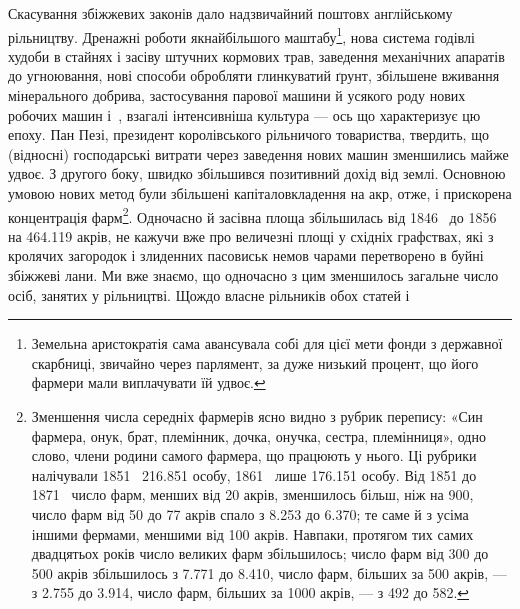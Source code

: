 Скасування збіжжевих законів дало надзвичайний поштовх
англійському рільництву. Дренажні роботи якнайбільшого маштабу\footnote{
Земельна аристократія сама авансувала собі для цієї мети фонди
з державної скарбниці, звичайно через парлямент, за дуже низький
процент, що його фармери мали виплачувати їй удвоє.
},
нова система годівлі худоби в стайнях і засіву штучних
кормових трав, заведення механічних апаратів до угноювання,
нові способи обробляти глинкуватий ґрунт, збільшене вживання
мінерального добрива, застосування парової машини й
усякого роду нових робочих машин і~, взагалі інтенсивніша
культура — ось що характеризує цю епоху. Пан Пезі, президент
королівського рільничого товариства, твердить, що (відносні)
господарські витрати через заведення нових машин зменшились
майже удвоє. З другого боку, швидко збільшився позитивний
дохід від землі. Основною умовою нових метод були збільшені
капіталовкладення на акр, отже, і прискорена концентрація
фарм\footnote{
Зменшення числа середніх фармерів ясно видно з рубрик перепису:
«Син фармера, онук, брат, племінник, дочка, онучка, сестра, племінниця»,
одно слово, члени родини самого фармера, що працюють у
нього. Ці рубрики налічували 1851~ \num{216.851} особу, 1861~ лише \num{176.151}
особу. Від 1851 до 1871~ число фарм, менших від 20 акрів, зменшилось
більш, ніж на 900, число фарм від 50 до 77 акрів спало з \num{8.253} до \num{6.370};
те саме й з усіма іншими фермами, меншими від 100 акрів. Навпаки,
протягом тих самих двадцятьох років число великих фарм збільшилось;
число фарм від 300 до 500 акрів збільшилось з \num{7.771} до \num{8.410}, число
фарм, більших за 500 акрів, — з \num{2.755} до \num{3.914}, число фарм, більших
за 1000 акрів, — з 492 до 582.
}. Одночасно й засівна площа збільшилась від 1846~
до 1856~ на \num{464.119} акрів, не кажучи вже про величезні площі
у східніх графствах, які з кролячих загородок і злиденних пасовиськ
немов чарами перетворено в буйні збіжжеві лани. Ми вже
знаємо, що одночасно з цим зменшилось загальне число осіб,
занятих у рільництві. Щождо власне рільників обох статей і
\parbreak{}  %
